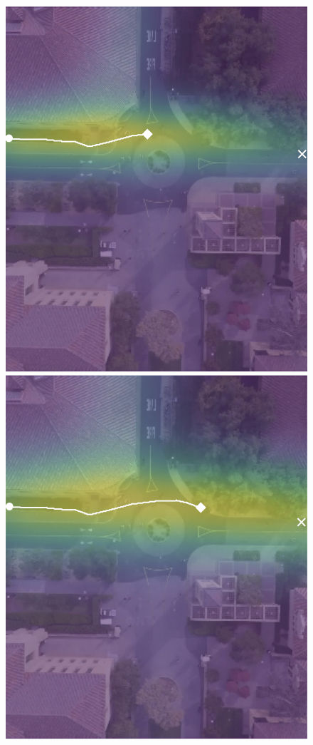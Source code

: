 \documentclass[letterpaper,10pt,conference]{ieeeconf}
\begin{document}
\begin{figure}
\begin{minipage}[t]{0.3\linewidth}
		\includegraphics[width=\linewidth]{./figures/comparison/ours_death_1_2_t=250.png}
	\end{minipage}
	\begin{minipage}[t]{0.3\linewidth}
		\includegraphics[width=\linewidth]{./figures/comparison/ours_death_1_2_t=370.png}
	\end{minipage}
	

\end{figure}
\end{document}

